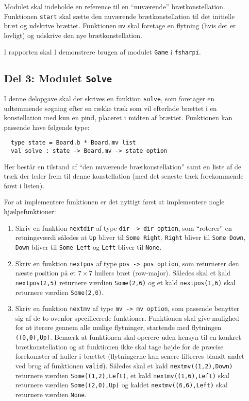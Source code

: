 Modulet skal indeholde en reference til en ``nuværende''
brætkonstellation. Funktionen \lstinline{start} skal sætte den
nuværende brætkonstellation til det initielle bræt og udskrive
brættet. Funktionen \lstinline{mv} skal foretage en flytning (hvis det
er lovligt) og udskrive den nye brætkonstellation.

I rapporten skal I demonstrere brugen af modulet \lstinline{Game}
i \texttt{fsharpi}.

\subsection*{Del 3: Modulet \lstinline{Solve}}

I denne delopgave skal der skrives en funktion \lstinline{solve}, som
foretager en udtømmende søgning efter en række træk som vil efterlade
brættet i en konstellation med kun en pind, placeret i midten af
brættet. Funktionen kan passende have følgende type:
\begin{lstlisting}
  type state = Board.b * Board.mv list
  val solve : state -> Board.mv -> state option
\end{lstlisting}

Her består en tilstand af ``den nuværende brætkonstellation'' samt en
liste af de træk der leder frem til denne konstellation (med det seneste træk forekommende først i listen).

For at implementere funktionen er det nyttigt først at implementere nogle
hjælpefunktioner:

\begin{enumerate}
\item Skriv en funktion \lstinline{nextdir} af type \lstinline{dir -> dir option},
som ``roterer'' en retningsværdi således at \lstinline{Up}
bliver til \lstinline{Some Right}, \lstinline{Right} bliver
til \lstinline{Some Down}, \lstinline{Down} bliver til \lstinline{Some Left}
og \lstinline{Left} bliver til \lstinline{None}.

\item Skriv en funktion \lstinline{nextpos} af type \lstinline{pos -> pos option},
som returnerer den næste position på et $7 \times 7$ hullers
bræt (row-major). Således skal et kald \lstinline{nextpos(2,5)}
returnere værdien \lstinline{Some(2,6)} og et
kald \lstinline{nextpos(1,6)} skal returnere
værdien \lstinline{Some(2,0)}.

\item Skriv en funktion \lstinline{nextmv} af type \lstinline{mv -> mv option}, som passende benytter sig af de to ovenfor specificerede funktioner. Funktionen skal give mulighed for at iterere gennem alle mulige flytninger, startende med flytningen \lstinline{((0,0),Up)}. Bemærk at funktionen skal operere uden hensyn til en konkret brætkonstellation og at funktionen ikke skal tage højde for de præcise forekomster af huller i brættet (flytningerne kan senere filtreres blandt andet ved brug af funktionen \lstinline{valid}).
%
Således skal et kald \lstinline{nextmv((1,2),Down)} returnere værdien \lstinline{Some((1,2),Left)}, et kald \lstinline{nextmv((1,6),Left)} skal returnere værdien \lstinline{Some((2,0),Up)} og kaldet \lstinline{nextmv((6,6),Left)} skal returnere værdien \lstinline{None}.
\end{enumerate}


